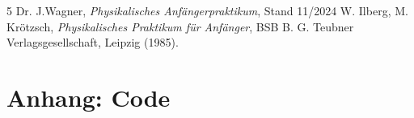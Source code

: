 \documentclass[12pt,a4paper,titlepage]{scrartcl}
\numberwithin{equation}{section}
\numberwithin{table}{section}
\numberwithin{figure}{section}
\begin{document}
\clearpage

\listoffigures


\listoftables

\begin{thebibliography}{5}
     Dr. J.Wagner, \emph{Physikalisches Anfängerpraktikum}, Stand 11/2024
     W. Ilberg, M. Krötzsch, \emph{Physikalisches Praktikum für Anfänger}, BSB B. G. Teubner Verlagsgesellschaft, Leipzig (1985).
\end{thebibliography}


\appendix
\section{Anhang: Code}



\end{document}
